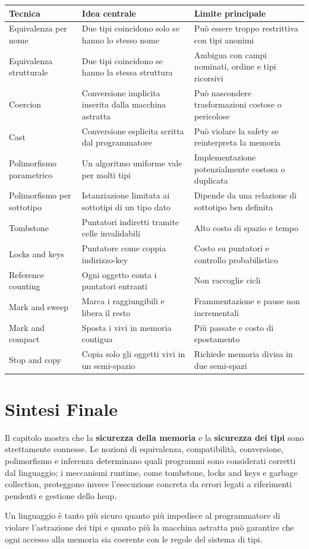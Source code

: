 \documentclass{article}
\begin{document}
\begin{center}
\begin{tabular}{|p{3.2cm}|p{5.2cm}|p{5.2cm}|}
\hline
\textbf{Tecnica} & \textbf{Idea centrale} & \textbf{Limite principale} \\
\hline
Equivalenza per nome & Due tipi coincidono solo se hanno lo stesso nome & Può essere troppo restrittiva con tipi anonimi \\
\hline
Equivalenza strutturale & Due tipi coincidono se hanno la stessa struttura & Ambigua con campi nominati, ordine e tipi ricorsivi \\
\hline
Coercion & Conversione implicita inserita dalla macchina astratta & Può nascondere trasformazioni costose o pericolose \\
\hline
Cast & Conversione esplicita scritta dal programmatore & Può violare la safety se reinterpreta la memoria \\
\hline
Polimorfismo parametrico & Un algoritmo uniforme vale per molti tipi & Implementazione potenzialmente costosa o duplicata \\
\hline
Polimorfismo per sottotipo & Istanziazione limitata ai sottotipi di un tipo dato & Dipende da una relazione di sottotipo ben definita \\
\hline
Tombstone & Puntatori indiretti tramite celle invalidabili & Alto costo di spazio e tempo \\
\hline
Locks and keys & Puntatore come coppia indirizzo-key & Costo su puntatori e controllo probabilistico \\
\hline
Reference counting & Ogni oggetto conta i puntatori entranti & Non raccoglie cicli \\
\hline
Mark and sweep & Marca i raggiungibili e libera il resto & Frammentazione e pause non incrementali \\
\hline
Mark and compact & Sposta i vivi in memoria contigua & Più passate e costo di spostamento \\
\hline
Stop and copy & Copia solo gli oggetti vivi in un semi-spazio & Richiede memoria divisa in due semi-spazi \\
\hline
\end{tabular}
\end{center}

\section{Sintesi Finale}

Il capitolo mostra che la \textbf{sicurezza della memoria} e la \textbf{sicurezza dei tipi} sono strettamente connesse. Le nozioni di equivalenza, compatibilità, conversione, polimorfismo e inferenza determinano quali programmi sono considerati corretti dal linguaggio; i meccanismi runtime, come tombstone, locks and keys e garbage collection, proteggono invece l'esecuzione concreta da errori legati a riferimenti pendenti e gestione dello heap.

Un linguaggio è tanto più sicuro quanto più impedisce al programmatore di violare l'astrazione dei tipi e quanto più la macchina astratta può garantire che ogni accesso alla memoria sia coerente con le regole del sistema di tipi.
\end{document}
